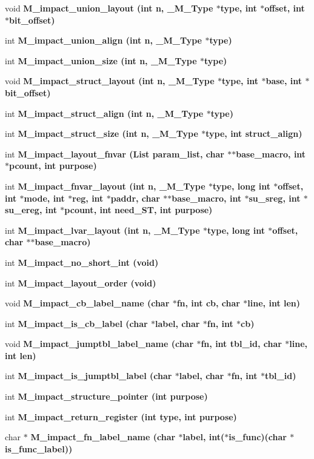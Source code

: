 \begin{CompactItemize}
\item 
void \bf{M\_\-impact\_\-union\_\-layout} (int n, \bf{\_\-M\_\-Type} $\ast$type, int $\ast$offset, int $\ast$bit\_\-offset)
\item 
int \bf{M\_\-impact\_\-union\_\-align} (int n, \bf{\_\-M\_\-Type} $\ast$type)
\item 
int \bf{M\_\-impact\_\-union\_\-size} (int n, \bf{\_\-M\_\-Type} $\ast$type)
\item 
void \bf{M\_\-impact\_\-struct\_\-layout} (int n, \bf{\_\-M\_\-Type} $\ast$type, int $\ast$base, int $\ast$bit\_\-offset)
\item 
int \bf{M\_\-impact\_\-struct\_\-align} (int n, \bf{\_\-M\_\-Type} $\ast$type)
\item 
int \bf{M\_\-impact\_\-struct\_\-size} (int n, \bf{\_\-M\_\-Type} $\ast$type, int struct\_\-align)
\item 
int \bf{M\_\-impact\_\-layout\_\-fnvar} (\bf{List} param\_\-list, char $\ast$$\ast$base\_\-macro, int $\ast$pcount, int purpose)
\item 
int \bf{M\_\-impact\_\-fnvar\_\-layout} (int n, \bf{\_\-M\_\-Type} $\ast$type, long int $\ast$offset, int $\ast$\bf{mode}, int $\ast$reg, int $\ast$paddr, char $\ast$$\ast$base\_\-macro, int $\ast$su\_\-sreg, int $\ast$su\_\-ereg, int $\ast$pcount, int need\_\-ST, int purpose)
\item 
int \bf{M\_\-impact\_\-lvar\_\-layout} (int n, \bf{\_\-M\_\-Type} $\ast$type, long int $\ast$offset, char $\ast$$\ast$base\_\-macro)
\item 
int \bf{M\_\-impact\_\-no\_\-short\_\-int} (void)
\item 
int \bf{M\_\-impact\_\-layout\_\-order} (void)
\item 
void \bf{M\_\-impact\_\-cb\_\-label\_\-name} (char $\ast$fn, int cb, char $\ast$line, int len)
\item 
int \bf{M\_\-impact\_\-is\_\-cb\_\-label} (char $\ast$label, char $\ast$fn, int $\ast$cb)
\item 
void \bf{M\_\-impact\_\-jumptbl\_\-label\_\-name} (char $\ast$fn, int tbl\_\-id, char $\ast$line, int len)
\item 
int \bf{M\_\-impact\_\-is\_\-jumptbl\_\-label} (char $\ast$label, char $\ast$fn, int $\ast$tbl\_\-id)
\item 
int \bf{M\_\-impact\_\-structure\_\-pointer} (int purpose)
\item 
int \bf{M\_\-impact\_\-return\_\-register} (int type, int purpose)
\item 
char $\ast$ \bf{M\_\-impact\_\-fn\_\-label\_\-name} (char $\ast$label, int($\ast$is\_\-func)(char $\ast$is\_\-func\_\-label))
$$
\end{CompactItemize}
